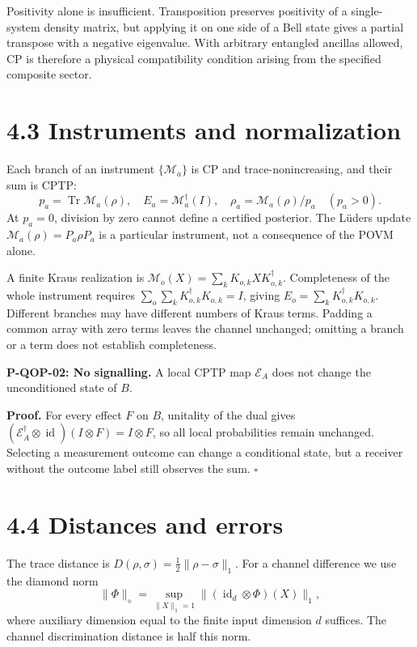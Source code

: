 \documentclass[
  11pt,
  oneside]{book}
\begin{document}
Positivity alone is insufficient. Transposition preserves positivity of
a single-system density matrix, but applying it on one side of a Bell
state gives a partial transpose with a negative eigenvalue. With
arbitrary entangled ancillas allowed, CP is therefore a physical
compatibility condition arising from the specified composite sector.

\section{4.3 Instruments and normalization}

Each branch of an instrument \(\{\mathcal M_a\}\) is CP and
trace-nonincreasing, and their sum is CPTP: \[
p_a=\operatorname{Tr}\mathcal M_a(\rho),\quad
E_a=\mathcal M_a^\dagger(I),\quad
\rho_a=\mathcal M_a(\rho)/p_a\quad(p_a>0).
\] At \(p_a=0\), division by zero cannot define a certified posterior.
The Lüders update \(\mathcal M_a(\rho)=P_a\rho P_a\) is a particular
instrument, not a consequence of the POVM alone.

A finite Kraus realization is
\(\mathcal M_o(X)=\sum_kK_{o,k}XK_{o,k}^\dagger\). Completeness of the
whole instrument requires \(\sum_o\sum_kK_{o,k}^\dagger K_{o,k}=I\),
giving \(E_o=\sum_kK_{o,k}^\dagger K_{o,k}\). Different branches may
have different numbers of Kraus terms. Padding a common array with zero
terms leaves the channel unchanged; omitting a branch or a term does not
establish completeness.

\label{p-qop-02}{}

\textbf{P-QOP-02: No signalling.} A local CPTP map \(\mathcal E_A\) does
not change the unconditioned state of \(B\).

\textbf{Proof.} For every effect \(F\) on \(B\), unitality of the dual
gives
\((\mathcal E_A^\dagger\otimes\operatorname{id})(I\otimes F)=I\otimes F\),
so all local probabilities remain unchanged. Selecting a measurement
outcome can change a conditional state, but a receiver without the
outcome label still observes the sum. \(\square\)

\section{4.4 Distances and errors}

The trace distance is \(D(\rho,\sigma)=\frac12\|\rho-\sigma\|_1\). For a
channel difference we use the diamond norm \[
\|\Phi\|_\diamond=\sup_{\|X\|_1=1}
\|(\operatorname{id}_d\otimes\Phi)(X)\|_1,
\] where auxiliary dimension equal to the finite input dimension \(d\)
suffices. The channel discrimination distance is half this norm.
\end{document}
